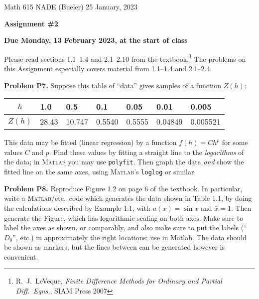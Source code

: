 \documentclass[12pt]{amsart}
\newcommand{\Matlab}{\textsc{Matlab}\xspace}
\newcommand{\prob}[1]{\bigskip\noindent\textbf{#1}\quad }
\begin{document}
\scriptsize \noindent Math 615 NADE (Bueler) \hfill 25 January, 2023
\normalsize

\medskip\bigskip

\Large\centerline{\textbf{Assignment \#2}}
\large
\bigskip

\centerline{\textbf{Due Monday, 13 February 2023, at the start of class}}
\bigskip
\normalsize

\thispagestyle{empty}

\bigskip
Please read sections 1.1--1.4 and 2.1--2.10 from the textbook.\footnote{R.~J.~LeVeque, \emph{Finite Difference Methods for Ordinary and Partial Diff.~Eqns.}, SIAM Press 2007}  The problems on this Assignment especially covers material from 1.1--1.4 and 2.1--2.4.

\medskip
\prob{Problem P7.}  Suppose this table of ``data'' gives samples of a function $Z(h)$:

\smallskip
\begin{center}
\begin{tabular}{c|l|l|l|l|l|l}
$h$ & 1.0     & 0.5    & 0.1    & 0.05   & 0.01     & 0.005 \\ \hline
$Z(h)$ & 28.43 & 10.747 & 0.5540 & 0.5555 & 0.04849 & 0.005521
\end{tabular}
\end{center}
\medskip

\noindent This data may be fitted (linear regression) by a function $f(h) = C h^p$ for some values $C$ and $p$.  Find these values by fitting a straight line to the \emph{logarithms} of the data; in \Matlab you may use \texttt{polyfit}.  Then graph the data \emph{and} show the fitted line on the same axes, using \Matlab's \texttt{loglog} or similar.

\begin{comment}
h = [1.0 0.5 0.1 0.05 0.01 0.005];
Z = [28.43  10.747  0.5540  0.5555  0.04849  0.005521];
q = polyfit(log(h),log(Z),1)
loglog(h,Z,'ko',h,exp(q(2) + q(1)*log(h)),'k--')
axis tight
print -dpdf Zofh.pdf
\end{comment}


\prob{Problem P8.}  Reproduce Figure 1.2 on page 6 of the textbook.  In particular, write a  \Matlab/etc.~code which generates the data shown in Table 1.1, by doing the calculations described by Example 1.1, with $u(x)=\sin x$ and $\bar x = 1$.  Then generate the Figure, which has logarithmic scaling on both axes.  Make sure to label the axes as shown, or comparably, and also make sure to put the labels (``$D_0$'', etc.) in approximately the right locations; use  in Matlab.  The data should be shown as markers, but the lines between can be generated however is convenient.
\end{document}
